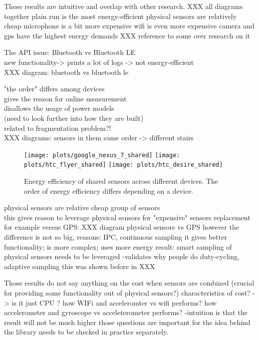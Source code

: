 Those results are intuitive and overlap with other research.
	XXX all diagrams together
	plain run is the most energy-efficient
	physical sensors are relatively cheap
	microphone is a bit more expensive 
	wifi is even more expensive
	camera and gps have the highest energy demands
	XXX reference to some over research on it
	

The API issue: Bluetooth vs Bluetooth LE\\
	new functionality-> prints a lot of logs -> not energy-efficient\\
	XXX diagram: bluetooth vs bluetooth le 
	
				
"the order" differs among devices\\
	gives the reason for online measurement\\
	disallows the usage of power models\\
		(need to look further into how they are built)\\
		related to fragmentation problem?!\\
	XXX diagrams: sensors in them same order -> different stairs
	
\begin{figure}[H]
\centering
\texttt{[image: plots/google\_nexus\_7\_shared]}
\texttt{[image: plots/htc\_flyer\_shared]}
\texttt{[image: plots/htc\_desire\_shared]}
\caption{\label{p:shared_sensors_results} Energy efficiency of shared sensors across different devices. The order of energy efficiency differs depending on a device. }
\end{figure}

physical sensors are relative cheap group of sensors \\
	this gives reason to leverage physical sensors for "expensive" sensors replacement
		for example versus GPS:
			XXX diagram physical sensors vs GPS
	however the difference is not so big,
		reasons: IPC, continuous sampling
			it gives better functionality; is more complex; uses more energy
		result: smart sampling of physical sensors needs to be leveraged
			-validates why people do duty-cycling, adaptive sampling
		this was shown before in XXX

Those results do not say anything on the cost when sensors are combined
		(crucial for providing some functionality out of physical sensors?)
		characteristics of cost? -> is it just CPU ?
			how WIFi and acceleromter vs wifi performs?
			how accelerometer and gyroscope vs acceleterometer performs?
				-intuition is that the result will not be much higher
			those questions are important for the idea behind  the library
				needs to be checked in practice separately.
		
